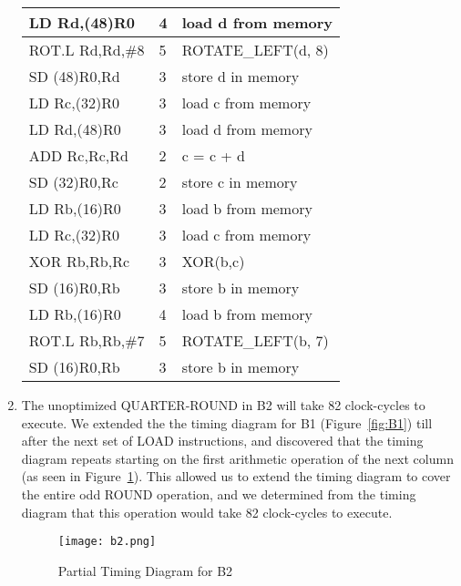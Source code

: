 \begin{enumerate}[wide, label=(B\arabic*)]
\begin{longtable}{|l|l|l|}
LD Rd,(48)R0	& 4	& load d from memory  \\ \hline
ROT.L Rd,Rd,\#8	& 5	& ROTATE\_LEFT(d, 8)  \\ \hline
SD (48)R0,Rd	& 3	& store d in memory   \\ \hline
LD Rc,(32)R0	& 3	& load c from memory  \\ \hline
LD Rd,(48)R0	& 3	& load d from memory  \\ \hline
ADD Rc,Rc,Rd	& 2	& c = c + d           \\ \hline
SD (32)R0,Rc	& 2	& store c in memory   \\ \hline
LD Rb,(16)R0	& 3	& load b from memory  \\ \hline
LD Rc,(32)R0	& 3	& load c from memory  \\ \hline
XOR Rb,Rb,Rc	& 3	& XOR(b,c)            \\ \hline
SD (16)R0,Rb	& 3	& store b in memory   \\ \hline
LD Rb,(16)R0	& 4	& load b from memory  \\ \hline
ROT.L Rb,Rb,\#7	& 5	& ROTATE\_LEFT(b, 7)  \\ \hline
SD (16)R0,Rb	& 3	& store b in memory   \\ \hline
\end{longtable}

\item The unoptimized QUARTER-ROUND in B2 will take 82 clock-cycles to execute. We extended the the timing diagram for B1 (Figure~\ref{fig:B1}) till after the next set of LOAD instructions, and discovered that the timing diagram repeats starting on the first arithmetic operation of the next column (as seen in Figure~\ref{fig:B2}). This allowed us to extend the timing diagram to cover the entire odd ROUND operation, and we determined from the timing diagram that this operation would take 82 clock-cycles to execute.
\begin{figure}[htp]
	\centering
	\texttt{[image: b2.png]}
	\caption{\label{fig:B2}Partial Timing Diagram for B2}
\end{figure}


\end{enumerate}
